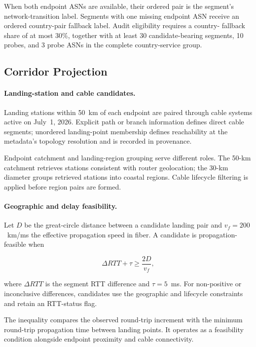 When both endpoint ASNs are available, their ordered pair is the segment's
network-transition label. Segments with one missing endpoint ASN receive an
ordered country-pair fallback label. Audit eligibility requires a country-
fallback share of at most 30\%, together with at least 30 candidate-bearing
segments, 10 probes, and 3 probe ASNs in the complete country-service group.

\subsection{Corridor Projection}
\label{sec:framework_projection}

\paragraph{Landing-station and cable candidates.}
Landing stations within 50~km of each endpoint are paired through cable systems
active on July~1, 2026. Explicit path or branch information defines direct
cable segments; unordered landing-point membership defines reachability at the
metadata's topology resolution and is recorded in provenance.

Endpoint catchment and landing-region grouping serve different roles. The
50-km catchment retrieves stations consistent with router geolocation; the
30-km diameter groups retrieved stations into coastal regions. Cable lifecycle
filtering is applied before region pairs are formed.

\paragraph{Geographic and delay feasibility.}
Let \(D\) be the great-circle distance between a candidate landing pair and
\(v_f=200\)~km/ms the effective propagation speed in fiber. A candidate is
propagation-feasible when

\begin{equation}
    \Delta RTT + \tau \geq \frac{2D}{v_f},
    \label{eq:rtt-feasibility}
\end{equation}

where \(\Delta RTT\) is the segment RTT difference and \(\tau=5\)~ms. For
non-positive or inconclusive differences, candidates use the geographic and
lifecycle constraints and retain an RTT-status flag.

The inequality compares the observed round-trip increment with the minimum
round-trip propagation time between landing points. It operates as a feasibility
condition alongside endpoint proximity and cable connectivity.

